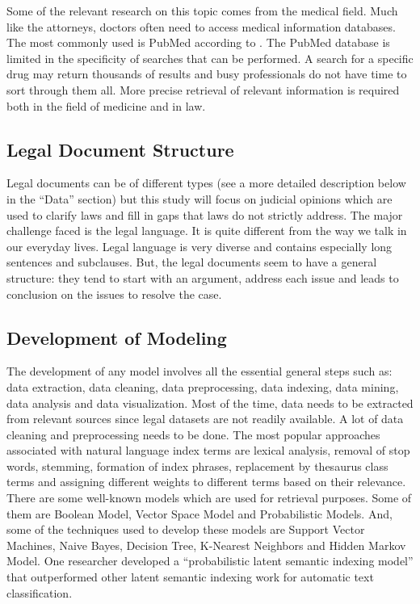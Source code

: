 \documentclass[11pt]{article}
\begin{document}
Some of the relevant research on this topic comes from the medical field.  Much like the attorneys, doctors often need to access medical information databases.  The most commonly used is PubMed according to \cite{lee2006beyond}.  The PubMed database is limited in the specificity of searches that can be performed.  A search for a specific drug may return thousands of results and busy professionals do not have time to sort through them all.  More precise retrieval of relevant information is required both in the field of medicine and in law.

\subsection{Legal Document Structure}
Legal documents can be of different types (see a more detailed description below in the ``Data'' section) but this study will focus on judicial opinions which are used to clarify laws and fill in gaps that laws do not strictly address. The major challenge faced is the legal language. It is quite different from the way we talk in our everyday lives. Legal language is very diverse and contains especially long sentences and subclauses. But, the legal documents seem to have a general structure: they tend to start with an argument, address each issue and leads to conclusion on the issues to resolve the case.

\subsection{Development of Modeling}
The development of any model involves all the essential general steps such as: data extraction, data cleaning, data preprocessing, data indexing, data mining, data analysis and data visualization. Most of the time, data needs to be extracted from relevant sources since legal datasets are not readily available. A lot of data cleaning and preprocessing needs to be done. The most popular approaches associated with natural language index terms are lexical analysis, removal of stop words, stemming, formation of index phrases, replacement by thesaurus class terms and assigning different weights to different terms based on their relevance. There are some well-known models which are used for retrieval purposes. Some of them are Boolean Model, Vector Space Model and Probabilistic Models. And, some of the techniques used to develop these models are Support Vector Machines, Naive Bayes, Decision Tree, K-Nearest Neighbors and Hidden Markov Model.  \cite{Moens2001} One researcher developed a ``probabilistic latent semantic indexing model'' that outperformed other latent semantic indexing work for automatic text classification. \cite{hofmann1999probabilistic} 
\end{document}
